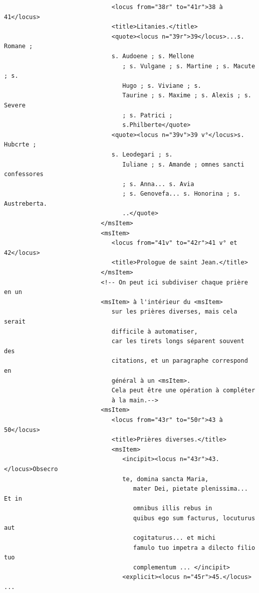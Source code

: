 \documentclass[a4paper,12pt,twoside]{book}
\begin{document}
\begin{verbatim}
                              <locus from="38r" to="41r">38 à 41</locus>
                              <title>Litanies.</title>
                              <quote><locus n="39r">39</locus>...s. Romane ; 
                              s. Audoene ; s. Mellone
                                 ; s. Vulgane ; s. Martine ; s. Macute ; s.
                                 Hugo ; s. Viviane ; s.
                                 Taurine ; s. Maxime ; s. Alexis ; s. Severe 
                                 ; s. Patrici ;
                                 s.Philberte</quote>
                              <quote><locus n="39v">39 v°</locus>s. Hubcrte ;
                              s. Leodegari ; s.
                                 Iuliane ; s. Amande ; omnes sancti confessores 
                                 ; s. Anna... s. Avia
                                 ; s. Genovefa... s. Honorina ; s. Austreberta.
                                 ..</quote>
                           </msItem>
                           <msItem>
                              <locus from="41v" to="42r">41 v° et 42</locus>
                              <title>Prologue de saint Jean.</title>
                           </msItem>
                           <!-- On peut ici subdiviser chaque prière en un
                           <msItem> à l'intérieur du <msItem> 
                              sur les prières diverses, mais cela serait 
                              difficile à automatiser, 
                              car les tirets longs séparent souvent des 
                              citations, et un paragraphe correspond en 
                              général à un <msItem>. 
                              Cela peut être une opération à compléter 
                              à la main.-->
                           <msItem>
                              <locus from="43r" to="50r">43 à 50</locus>
                              <title>Prières diverses.</title>
                              <msItem>
                                 <incipit><locus n="43r">43.</locus>Obsecro
                                 te, domina sancta Maria,
                                    mater Dei, pietate plenissima... Et in
                                    omnibus illis rebus in
                                    quibus ego sum facturus, locuturus aut 
                                    cogitaturus... et michi
                                    famulo tuo impetra a dilecto filio tuo 
                                    complementum ... </incipit>
                                 <explicit><locus n="45r">45.</locus> ...

\end{verbatim}
\end{document}

